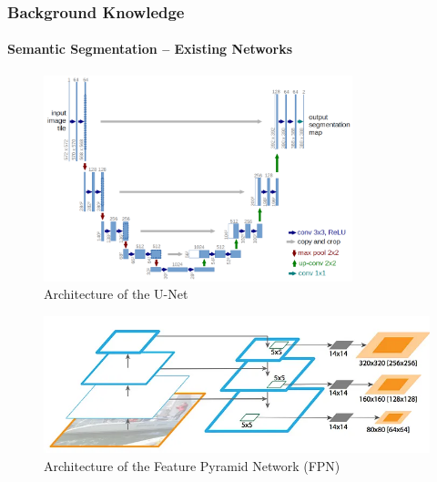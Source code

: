 \documentclass[t,aspectratio=169]{beamer}
\begin{document}
\begin{frame}[fragile]
  
  \frametitle{Background Knowledge}
  \framesubtitle{Semantic Segmentation -- Existing Networks}
  
  \begin{minipage}[b]{0.49\textwidth}
    \vspace{0pt}
    \begin{figure}
      \includegraphics[width=0.8\textwidth]{figures/unet-architecture-t.png}
      \caption{Architecture of the U-Net}
    \end{figure}
  \end{minipage}
  \hfill
  \pause
  \begin{minipage}[b]{0.49\textwidth}
    \vspace{0pt}
    \begin{figure}
      \includegraphics[width=1\textwidth]{figures/fpn-architecture-t.png}
      \caption{Architecture of the Feature Pyramid Network (FPN)}
    \end{figure}
  \end{minipage}%
  

\end{frame}
\end{document}
